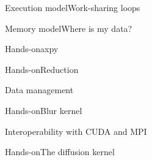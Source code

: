 \documentclass[12pt,aspectratio=169]{beamer}
\begin{document}
\begin{frame}{Execution model}{Work-sharing loops}
\end{frame}

\begin{frame}{Memory model}{Where is my data?}

\end{frame}

\begin{frame}{Hands-on}{axpy}

\end{frame}


\begin{frame}{Hands-on}{Reduction}

\end{frame}

\begin{frame}{Data management}

\end{frame}

\begin{frame}{Hands-on}{Blur kernel}

\end{frame}

\begin{frame}{Interoperability with CUDA and MPI}

\end{frame}

\begin{frame}{Hands-on}{The diffusion kernel}

\end{frame}



\end{document}
